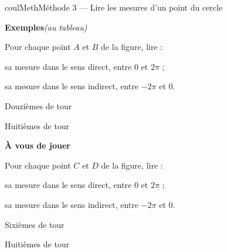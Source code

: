 \documentclass[11pt,a4paper]{article}
\makeatletter
\newcounter{lycee@signet}
\newcommand{\signet}[3][]{\stepcounter{lycee@signet}%
  \edef\lycee@dest{\if\relax\detokenize{#1}\relax
    signet.\arabic{lycee@signet}\else#1\fi}%
  \hypertarget{\lycee@dest}{}\bookmark[level=#2,dest=\lycee@dest]{#3}}
\newcounter{methode}
\newenvironment{methodebox}[1][Méthode]{\stepcounter{methode}%
  \begin{boitecours}[phantom={\signet[methode-\arabic{methode}]{2}{#1}}]{coulMeth}{#1}}%
  {\end{boitecours}}
\newcommand{\etape}[1]{\par\smallskip\textbf{\color{coulMeth}#1}\par\nobreak\smallskip}
\newcommand{\autableau}{\hfill{\footnotesize\itshape\color{black!45}(au tableau)}}
\newcommand{\etapeexemples}{%
    \par\smallskip\textbf{\color{coulMeth}Exemples}\autableau\par\nobreak\smallskip}
\makeatother
\begin{document}
\begin{methodebox}[Méthode 3 --- Lire les mesures d'un point du cercle]
\etapeexemples
\begin{minipage}[c]{0.40\linewidth}\raggedright
Pour chaque point $A$ et $B$ de la figure, lire :
\begin{questions}[label=\alph*)]
  \item sa mesure dans le sens direct, entre $0$ et $2\pi$ ;
  \item sa mesure dans le sens indirect, entre $-2\pi$ et $0$.
\end{questions}
\end{minipage}\hfill
\begin{minipage}[c]{0.28\linewidth}\centering
Douzièmes de tour\par
{}
\end{minipage}\hfill
\begin{minipage}[c]{0.28\linewidth}\centering
Huitièmes de tour\par
{}
\end{minipage}

\etape{À vous de jouer}
\begin{minipage}[c]{0.40\linewidth}\raggedright
Pour chaque point $C$ et $D$ de la figure, lire :
\begin{questions}[label=\alph*)]
  \item sa mesure dans le sens direct, entre $0$ et $2\pi$ ;
  \item sa mesure dans le sens indirect, entre $-2\pi$ et $0$.
\end{questions}
\end{minipage}\hfill
\begin{minipage}[c]{0.28\linewidth}\centering
Sixièmes de tour\par
{}
\end{minipage}\hfill
\begin{minipage}[c]{0.28\linewidth}\centering
Huitièmes de tour\par
{}
\end{minipage}

\end{methodebox}
\end{document}
